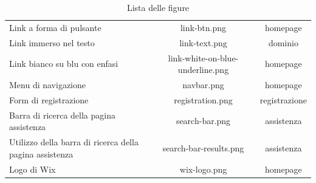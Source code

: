 \documentclass[11pt,a4paper]{article}
\begin{document}
\begin{table}[]
\begin{tabular}{||p{4cm}|c|c||}
     Link a forma di pulsante & link-btn.png & homepage \\
     Link immerso nel testo & link-text.png & dominio \\
     Link bianco su blu con enfasi & link-white-on-blue-underline.png & homepage \\
     Menu di navigazione & navbar.png & homepage \\
     Form di registrazione & registration.png & registrazione \\
     Barra di ricerca della pagina assistenza & search-bar.png & assistenza \\
     Utilizzo della barra di ricerca della pagina assistenza & search-bar-results.png & assistenza \\
     Logo di Wix & wix-logo.png & homepage \\
     \hline
  \end{tabular}
  \caption{Lista delle figure}
  \label{table:list-of-figures}
\end{table}
\end{document}
